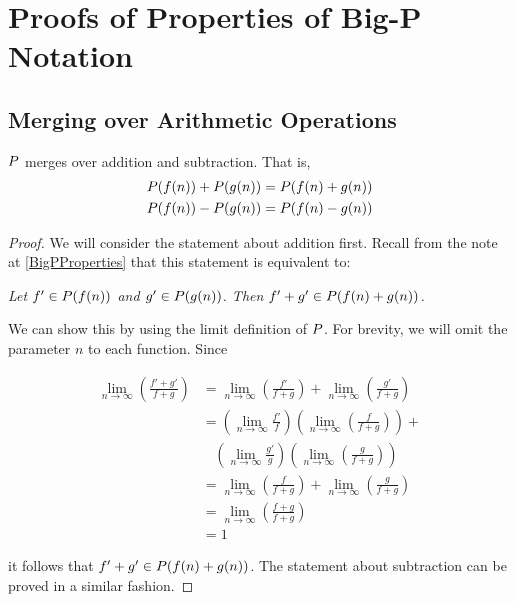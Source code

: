 \appendix
\appendixpage

\section{Proofs of Properties of Big-P Notation}

\subsection{Merging over Arithmetic Operations}
\label{MergingOverArithmetic}

\begin{theorem}
	$P$ merges over addition and subtraction. That is,
	\begin{align*}
	P(f(n)) + P(g(n)) &= P(f(n) + g(n))\\
	P(f(n)) - P(g(n)) &= P(f(n) - g(n))
	\end{align*}
\end{theorem}

\begin{proof}
	We will consider the statement about addition first. Recall from the note at \ref{BigPProperties} that this statement is equivalent to:
	
	\textit{Let $f' \in P(f(n))$ and $g' \in P(g(n))$. Then $f' + g' \in P(f(n) + g(n))$.}
	
	We can show this by using the limit definition of $P$. For brevity, we will omit the parameter $n$ to each function. Since
	
	\begin{align*}
	\lim_{n \to \infty} \left( \frac{f' + g'}{f + g} \right) &= \lim_{n \to \infty} \left( \frac{f'}{f + g} \right) + \lim_{n \to \infty} \left( \frac{g'}{f + g} \right)\\
	&= \left( \lim_{n \to \infty} \frac{f'}{f} \right) \left( \lim_{n \to \infty} \left( \frac{f}{f + g} \right) \right) +\\
	&\ \ \ \ \left( \lim_{n \to \infty} \frac{g'}{g} \right) \left( \lim_{n \to \infty} \left( \frac{g}{f + g} \right) \right)\\
	&= \lim_{n \to \infty} \left( \frac{f}{f + g} \right) + \lim_{n \to \infty} \left( \frac{g}{f + g} \right)\\
	&= \lim_{n \to \infty} \left( \frac{f + g}{f + g} \right)\\
	&= 1
	\end{align*}
	
	it follows that $f' + g' \in P(f(n) + g(n))$. The statement about subtraction can be proved in a similar fashion.
\end{proof}

